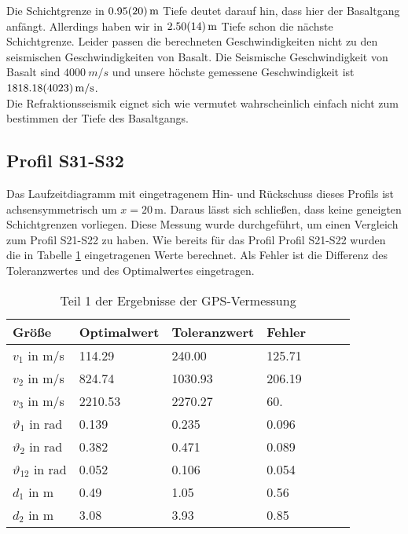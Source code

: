 
Die Schichtgrenze in $\SI{0.95 \pm 0.20}{m}$  Tiefe deutet darauf hin, dass hier der Basaltgang anfängt. Allerdings haben wir in $\SI{2.50 \pm 0.14}{m}$ Tiefe schon die nächste Schichtgrenze. Leider passen die berechneten Geschwindigkeiten nicht zu den seismischen Geschwindigkeiten von Basalt. Die Seismische Geschwindigkeit von Basalt sind $\SI{4000}{m/s}$ und unsere höchste gemessene Geschwindigkeit ist $\SI{1818.18 \pm 40.23}{m/s}$.\\
Die Refraktionsseismik eignet sich wie vermutet wahrscheinlich einfach nicht zum bestimmen der Tiefe des Basaltgangs. 


\subsection{Profil S31-S32}

Das Laufzeitdiagramm mit eingetragenem Hin- und Rückschuss dieses Profils ist achsensymmetrisch um $x=20$\,m. Daraus lässt sich schließen, dass keine geneigten Schichtgrenzen vorliegen.
Diese Messung wurde durchgeführt, um einen Vergleich zum Profil S21-S22 zu haben.
Wie bereits für das Profil Profil S21-S22 wurden die in Tabelle \ref{tab:S31-S32} eingetragenen Werte berechnet. Als Fehler ist die Differenz des Toleranzwertes und des Optimalwertes eingetragen.\\



\begin{table}[!ht]
\centering
\caption{Teil 1 der Ergebnisse der GPS-Vermessung}
\label{tab:S31-S32}
\begin{tabular}{lllllll}
\toprule
Größe   & Optimalwert   & Toleranzwert   & Fehler \\
\midrule
$v_1$ in m/s & 114.29 & 240.00 &  125.71\\
$v_2$ in m/s & 824.74 & 1030.93 & 206.19 \\
$v_3$ in m/s & 2210.53 & 2270.27 & 60. \\
$\vartheta_1$ in rad & 0.139 & 0.235 & 0.096  \\
$\vartheta_2$ in rad & 0.382 & 0.471 & 0.089 \\
$\vartheta_{12}$ in rad & 0.052 & 0.106 & 0.054 \\
$d_1$ in m & 0.49 & 1.05 & 0.56 \\
$d_2$ in m & 3.08 & 3.93 & 0.85 \\

\bottomrule
\end{tabular}
\end{table}

